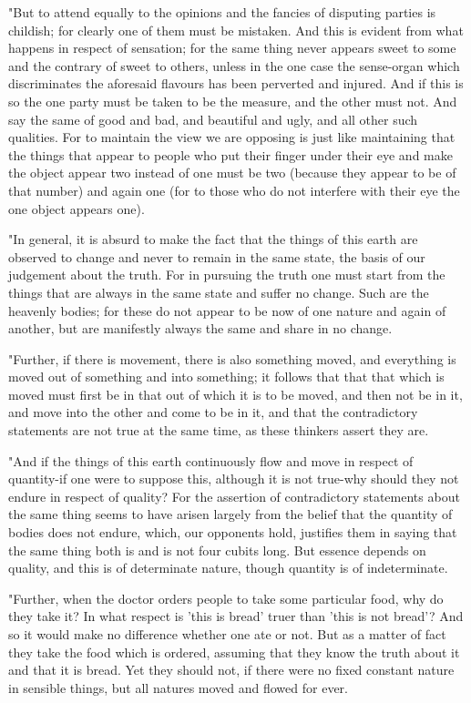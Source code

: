 "But to attend equally to the opinions and the fancies of disputing
parties is childish; for clearly one of them must be mistaken. And
this is evident from what happens in respect of sensation; for the
same thing never appears sweet to some and the contrary of sweet to
others, unless in the one case the sense-organ which discriminates
the aforesaid flavours has been perverted and injured. And if this
is so the one party must be taken to be the measure, and the other
must not. And say the same of good and bad, and beautiful and ugly,
and all other such qualities. For to maintain the view we are opposing
is just like maintaining that the things that appear to people who
put their finger under their eye and make the object appear two instead
of one must be two (because they appear to be of that number) and
again one (for to those who do not interfere with their eye the one
object appears one). 

"In general, it is absurd to make the fact that the things of this
earth are observed to change and never to remain in the same state,
the basis of our judgement about the truth. For in pursuing the truth
one must start from the things that are always in the same state and
suffer no change. Such are the heavenly bodies; for these do not appear
to be now of one nature and again of another, but are manifestly always
the same and share in no change. 

"Further, if there is movement, there is also something moved, and
everything is moved out of something and into something; it follows
that that that which is moved must first be in that out of which it
is to be moved, and then not be in it, and move into the other and
come to be in it, and that the contradictory statements are not true
at the same time, as these thinkers assert they are. 

"And if the things of this earth continuously flow and move in respect
of quantity-if one were to suppose this, although it is not true-why
should they not endure in respect of quality? For the assertion of
contradictory statements about the same thing seems to have arisen
largely from the belief that the quantity of bodies does not endure,
which, our opponents hold, justifies them in saying that the same
thing both is and is not four cubits long. But essence depends on
quality, and this is of determinate nature, though quantity is of
indeterminate. 

"Further, when the doctor orders people to take some particular food,
why do they take it? In what respect is 'this is bread' truer than
'this is not bread'? And so it would make no difference whether one
ate or not. But as a matter of fact they take the food which is ordered,
assuming that they know the truth about it and that it is bread. Yet
they should not, if there were no fixed constant nature in sensible
things, but all natures moved and flowed for ever. 

